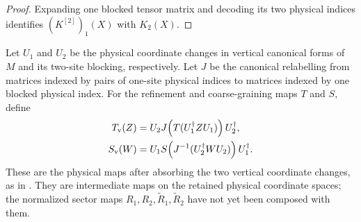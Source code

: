 \begin{proof}\leanok
    Expanding one blocked tensor matrix and decoding its two physical indices
    identifies $(K^{[2]})_1(X)$ with $K_2(X)$.
\end{proof}

\begin{definition}
    \label{def:mpdo_vertical_coordinate_map_transport}
    \leanok
    Let $U_1$ and $U_2$ be the physical coordinate changes in vertical
    canonical forms of $M$ and its two-site blocking, respectively. Let
    $J$ be the canonical relabelling from matrices indexed by pairs of
    one-site physical indices to matrices indexed by one blocked physical
    index. For the refinement and coarse-graining maps $T$ and $S$, define
    \begin{align}
        T_{\mathrm v}(Z)
         & =U_2 J\!\left(T(U_1^\dagger ZU_1)\right)U_2^\dagger,
        \notag                                                       \\
        S_{\mathrm v}(W)
         & =U_1 S\!\left(J^{-1}(U_2^\dagger WU_2)\right)U_1^\dagger.
        \notag
    \end{align}
    These are the physical maps after absorbing the two vertical coordinate
    changes, as in
    \cite[Appendix~C.4, lines~1955--1979]{Cirac2016MPDO_arXiv}. They are
    intermediate maps on the retained physical coordinate spaces; the
    normalized sector maps $R_1,R_2,\widetilde R_1,\widetilde R_2$ have not
    yet been composed with them.
\end{definition}

